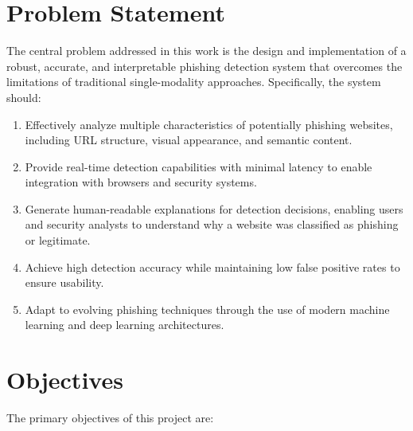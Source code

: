 \documentclass[12pt,a4paper]{report}
\begin{document}
\section{Problem Statement}

The central problem addressed in this work is the design and implementation of a robust, accurate, and interpretable phishing detection system that overcomes the limitations of traditional single-modality approaches. Specifically, the system should:

\begin{enumerate}
    \item Effectively analyze multiple characteristics of potentially phishing websites, including URL structure, visual appearance, and semantic content.
    \item Provide real-time detection capabilities with minimal latency to enable integration with browsers and security systems.
    \item Generate human-readable explanations for detection decisions, enabling users and security analysts to understand why a website was classified as phishing or legitimate.
    \item Achieve high detection accuracy while maintaining low false positive rates to ensure usability.
    \item Adapt to evolving phishing techniques through the use of modern machine learning and deep learning architectures.
\end{enumerate}

\section{Objectives}

The primary objectives of this project are:
\end{document}
